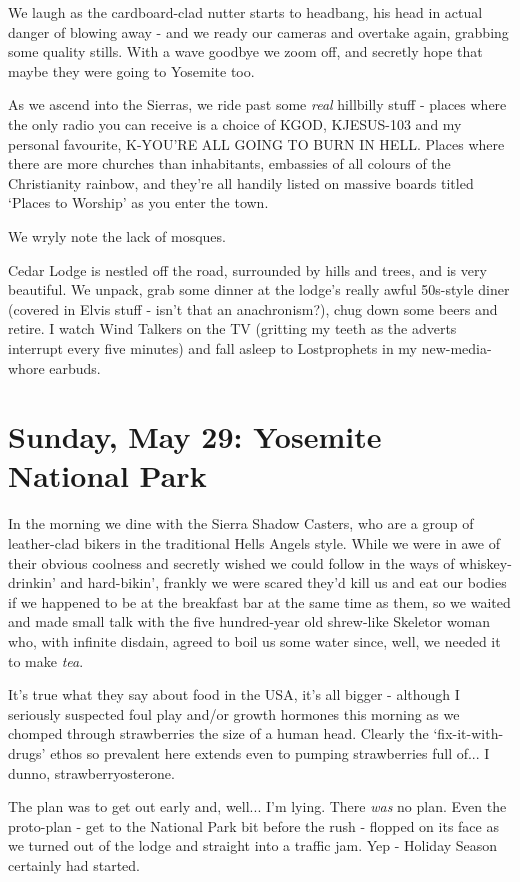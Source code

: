 \documentclass[a5paper,titlepage,11pt]{book}
\begin{document}
We laugh as the cardboard-clad nutter starts to headbang, his head in actual danger of blowing away - and we ready our cameras and overtake again, grabbing some quality stills.  With a wave goodbye we zoom off, and secretly hope that maybe they were going to Yosemite too.

As we ascend into the Sierras, we ride past some \emph{real} hillbilly stuff - places where the only radio you can receive is a choice of KGOD, KJESUS-103 and my personal favourite, K-YOU'RE ALL GOING TO BURN IN HELL.  Places where there are more churches than inhabitants, embassies of all colours of the Christianity rainbow, and they're all handily listed on massive boards titled `Places to Worship' as you enter the town.

We wryly note the lack of mosques.

Cedar Lodge is nestled off the road, surrounded by hills and trees, and is very beautiful.  We unpack, grab some dinner at the lodge's really awful 50s-style diner (covered in Elvis stuff - isn't that an anachronism?), chug down some beers and retire.  I watch Wind Talkers on the TV (gritting my teeth as the adverts interrupt every five minutes) and fall asleep to Lostprophets in my new-media-whore earbuds.

\chapter[Yosemite National Park]{Sunday, May 29: Yosemite National Park}
In the morning we dine with the Sierra Shadow Casters, who are a group of leather-clad bikers in the traditional Hells Angels style.  While we were in awe of their obvious coolness and secretly wished we could follow in the ways of whiskey-drinkin' and hard-bikin', frankly we were scared they'd kill us and eat our bodies if we happened to be at the breakfast bar at the same time as them, so we waited and made small talk with the five hundred-year old shrew-like Skeletor woman who, with infinite disdain, agreed to boil us some water since, well, we needed it to make \emph{tea}.

It's true what they say about food in the USA, it's all bigger - although I seriously suspected foul play and/or growth hormones this morning as we chomped through strawberries the size of a human head.  Clearly the `fix-it-with-drugs' ethos so prevalent here extends even to pumping strawberries full of... I dunno, strawberryosterone.

The plan was to get out early and, well... I'm lying.  There \emph{was} no plan.  Even the proto-plan - get to the National Park bit before the rush - flopped on its face as we turned out of the lodge and straight into a traffic jam.  Yep - Holiday Season certainly had started.
\end{document}
